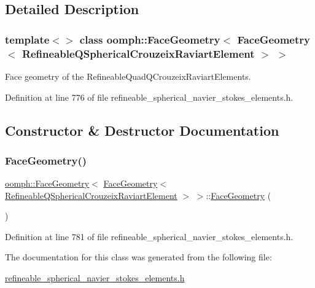 \subsection{Detailed Description}
\subsubsection*{template$<$$>$\newline
class oomph\+::\+Face\+Geometry$<$ Face\+Geometry$<$ Refineable\+Q\+Spherical\+Crouzeix\+Raviart\+Element $>$ $>$}

Face geometry of the Refineable\+Quad\+Q\+Crouzeix\+Raviart\+Elements. 

Definition at line 776 of file refineable\+\_\+spherical\+\_\+navier\+\_\+stokes\+\_\+elements.\+h.



\subsection{Constructor \& Destructor Documentation}
\mbox{\label{classoomph_1_1FaceGeometry_3_01FaceGeometry_3_01RefineableQSphericalCrouzeixRaviartElement_01_4_01_4_a7486a247a6bad47e29ab6cae2d9f14d4}} 
\subsubsection{\texorpdfstring{Face\+Geometry()}{FaceGeometry()}}
{\footnotesize\ttfamily \hyperlink{classoomph_1_1FaceGeometry}{oomph\+::\+Face\+Geometry}$<$ \hyperlink{classoomph_1_1FaceGeometry}{Face\+Geometry}$<$ \hyperlink{classoomph_1_1RefineableQSphericalCrouzeixRaviartElement}{Refineable\+Q\+Spherical\+Crouzeix\+Raviart\+Element} $>$ $>$\+::\hyperlink{classoomph_1_1FaceGeometry}{Face\+Geometry} (\begin{DoxyParamCaption}{ }\end{DoxyParamCaption})\hspace{0.3cm}{\ttfamily [inline]}}



Definition at line 781 of file refineable\+\_\+spherical\+\_\+navier\+\_\+stokes\+\_\+elements.\+h.



The documentation for this class was generated from the following file\+:\begin{DoxyCompactItemize}
\item 
\hyperlink{refineable__spherical__navier__stokes__elements_8h}{refineable\+\_\+spherical\+\_\+navier\+\_\+stokes\+\_\+elements.\+h}\end{DoxyCompactItemize}
